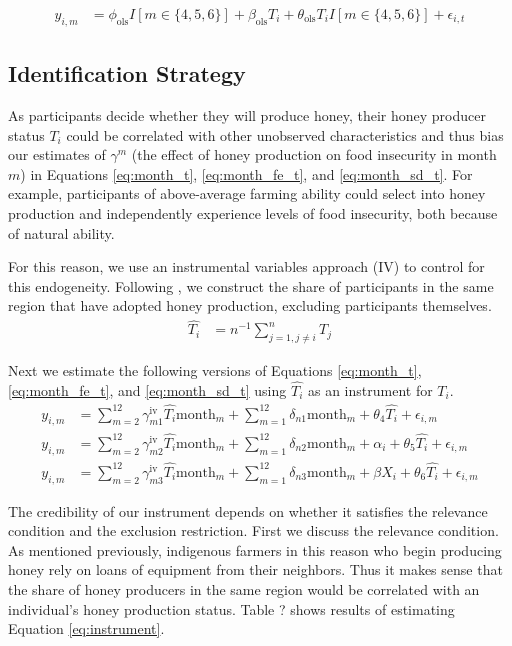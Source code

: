 \documentclass[../main.tex]{subfiles}
\begin{document}
\begin{align}
    y_{i,m} &= \phi_{\text{ols}} I[m \in \{4,5,6\}] + \beta_{\text{ols}} T_i + \theta_{\text{ols}} T_i I[m \in \{4,5,6\}] + \epsilon_{i,t}
\end{align}

\subsection{Identification Strategy}
As participants decide whether they will produce honey,
their honey producer status $T_i$ could be correlated
with other unobserved characteristics and thus bias our estimates of 
$\gamma^m$ (the effect of honey production on food insecurity
in month $m$) in Equations
\eqref{eq:month_t}, \eqref{eq:month_fe_t}, and \eqref{eq:month_sd_t}.
For example, participants of above-average farming ability 
could select into honey production and independently experience
levels of food insecurity, both because of natural ability.

For this reason, we use an instrumental variables approach (IV) to
control for this endogeneity. Following \textcite{sellare_sustainability_2020},
we construct the share of participants in the same region 
that have adopted honey production, excluding participants themselves.
\begin{align}
\label{eq:instrument}
    \hat{T_i} &= n^{-1} \sum_{j=1, j \ne i}^n T_j 
\end{align}

Next we estimate the following versions of Equations \eqref{eq:month_t}, \eqref{eq:month_fe_t}, and \eqref{eq:month_sd_t} using $\hat{T_i}$ as an
instrument for $T_i$.
\begin{align} 
\label{eq:month_t_iv}
 y_{i,m} &= \sum_{m=2}^{12} \gamma_{m1}^{\text{iv}} \hat{T_i} \text{month}_{m} + 
 \sum_{m=1}^{12} \delta_{n1} \text{month}_{m} + \theta_4 \hat{T_i}
 + \epsilon_{i,m}  \\
 \label{eq:month_fe_t_iv}
 y_{i,m} &= \sum_{m=2}^{12} \gamma_{m2}^{\text{iv}} \hat{T_i} \text{month}_{m} + 
 \sum_{m=1}^{12} \delta_{n2} \text{month}_{m} + \alpha_i + \theta_5 \hat{T_i} + \epsilon_{i,m}  \\
  \label{eq:month_sd_t_iv}
y_{i,m} &= \sum_{m=2}^{12} \gamma_{m3}^{\text{iv}} \hat{T_i} \text{month}_{m} + 
 \sum_{m=1}^{12} \delta_{n3} \text{month}_{m} + \beta X_i + \theta_6 \hat{T_i} +\epsilon_{i,m}      
\end{align}

The credibility of our instrument depends on whether it satisfies the
relevance condition and the exclusion restriction. First we discuss
the relevance condition. As mentioned previously,
indigenous farmers in this reason who begin producing honey rely
on loans of equipment from their neighbors. Thus it makes sense
that the share of honey producers in the same region would be correlated
with an individual's honey production status. Table ? shows results
of estimating Equation \eqref{eq:instrument}.
\end{document}
